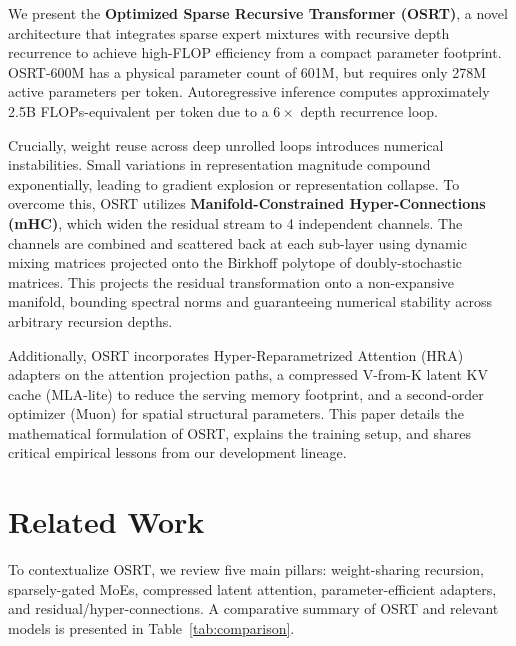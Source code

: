 \documentclass[11pt,twocolumn]{article}
\begin{document}
We present the \textbf{Optimized Sparse Recursive Transformer (OSRT)}, a novel architecture that integrates sparse expert mixtures with recursive depth recurrence to achieve high-FLOP efficiency from a compact parameter footprint. OSRT-600M has a physical parameter count of 601M, but requires only 278M active parameters per token. Autoregressive inference computes approximately 2.5B FLOPs-equivalent per token due to a $6\times$ depth recurrence loop. 

Crucially, weight reuse across deep unrolled loops introduces numerical instabilities. Small variations in representation magnitude compound exponentially, leading to gradient explosion or representation collapse. To overcome this, OSRT utilizes \textbf{Manifold-Constrained Hyper-Connections (mHC)}, which widen the residual stream to 4 independent channels. The channels are combined and scattered back at each sub-layer using dynamic mixing matrices projected onto the Birkhoff polytope of doubly-stochastic matrices. This projects the residual transformation onto a non-expansive manifold, bounding spectral norms and guaranteeing numerical stability across arbitrary recursion depths.

Additionally, OSRT incorporates Hyper-Reparametrized Attention (HRA) adapters on the attention projection paths, a compressed V-from-K latent KV cache (MLA-lite) to reduce the serving memory footprint, and a second-order optimizer (Muon) for spatial structural parameters. This paper details the mathematical formulation of OSRT, explains the training setup, and shares critical empirical lessons from our development lineage.

\section{Related Work}
To contextualize OSRT, we review five main pillars: weight-sharing recursion, sparsely-gated MoEs, compressed latent attention, parameter-efficient adapters, and residual/hyper-connections. A comparative summary of OSRT and relevant models is presented in Table~\ref{tab:comparison}.
\end{document}
